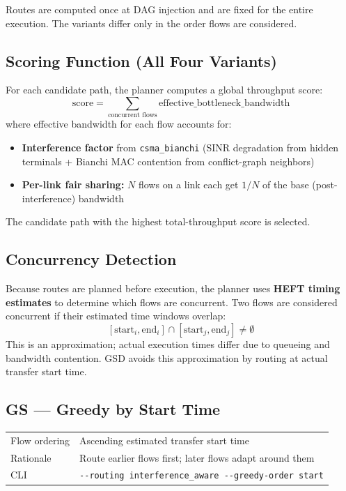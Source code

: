\documentclass[11pt]{article}
\begin{document}
Routes are computed once at DAG injection and are fixed for the entire
execution.  The variants differ only in the order flows are considered.

\subsection{Scoring Function (All Four Variants)}

For each candidate path, the planner computes a global throughput score:
\[
  \text{score} = \sum_{\text{concurrent flows}} \text{effective\_bottleneck\_bandwidth}
\]
where effective bandwidth for each flow accounts for:
\begin{itemize}
\item \textbf{Interference factor} from \texttt{csma\_bianchi} (SINR
      degradation from hidden terminals + Bianchi MAC contention from
      conflict-graph neighbors)
\item \textbf{Per-link fair sharing:} $N$ flows on a link each get $1/N$ of
      the base (post-interference) bandwidth
\end{itemize}
The candidate path with the highest total-throughput score is selected.

\subsection{Concurrency Detection}

Because routes are planned before execution, the planner uses \textbf{HEFT
timing estimates} to determine which flows are concurrent.  Two flows
are considered concurrent if their estimated time windows overlap:
\[
  [\text{start}_i, \text{end}_i] \cap [\text{start}_j, \text{end}_j] \neq \emptyset
\]
This is an approximation; actual execution times differ due to queueing
and bandwidth contention.  GSD avoids this approximation by routing at
actual transfer start time.

\subsection{GS --- Greedy by Start Time}

\begin{tabular}{@{}lp{9cm}@{}}
\toprule
Flow ordering & Ascending estimated transfer start time \\
Rationale     & Route earlier flows first; later flows adapt around them \\
CLI           & \texttt{-{}-routing interference\_aware -{}-greedy-order start} \\
\bottomrule
\end{tabular}
\end{document}
